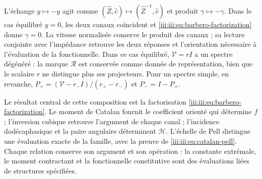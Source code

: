 L’échange $y\mapsto-y$ agit comme
$(\widehat Z,\widehat c)\mapsto(\widehat Z^{-1},\widehat c)$ et
produit $\gamma\mapsto-\gamma$. Dans le cas équilibré $y=0$,
les deux canaux coïncident et \eqref{iii:iii:eq:barbero-factorization} donne
$\gamma=0$. La vitesse normalisée conserve le produit des
canaux ; sa lecture conjointe avec l’impédance retrouve les deux
réponses et l’orientation nécessaire à l’évaluation de la fonctionnelle.
Dans ce cas équilibré, $\mathcal V=rI$ a un spectre dégénéré :
la marque $\mathcal R$ est conservée comme donnée de représentation, bien que
le scalaire $r$ ne distingue plus ses projecteurs. Pour un spectre simple,
en revanche,
$P_+=(\mathcal V-r_-I)/(r_+-r_-)$ et $P_-=I-P_+$.

Le résultat central de cette composition est la factorisation
\eqref{iii:iii:eq:barbero-factorization}. Le moment de Catalan fournit le
coefficient orienté qui détermine $f$ ; l’inversion cubique retrouve
l’argument de chaque canal ; l’incidence dodécaphasique et la paire angulaire
déterminent $\mathcal H$. L’échelle de Pell distingue une évaluation
exacte de la famille, avec la preuve de
\eqref{iii:iii:eq:catalan-pell}. Chaque relation conserve son argument et son
opération : la constante extrémale, le moment contractant et la fonctionnelle
constitutive sont des évaluations liées de structures
spécifiées.
